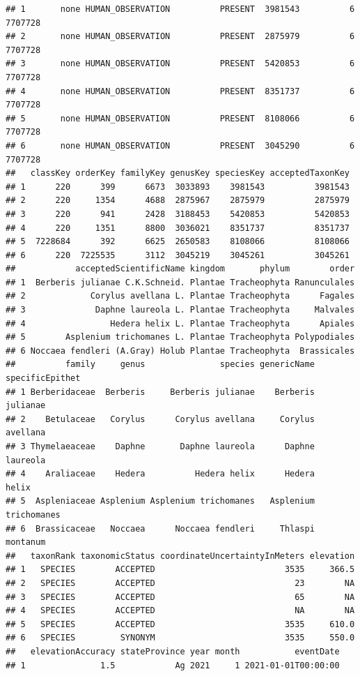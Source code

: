 \documentclass[
]{book}
\begin{document}
\begin{verbatim}
## 1       none HUMAN_OBSERVATION          PRESENT  3981543          6   7707728
## 2       none HUMAN_OBSERVATION          PRESENT  2875979          6   7707728
## 3       none HUMAN_OBSERVATION          PRESENT  5420853          6   7707728
## 4       none HUMAN_OBSERVATION          PRESENT  8351737          6   7707728
## 5       none HUMAN_OBSERVATION          PRESENT  8108066          6   7707728
## 6       none HUMAN_OBSERVATION          PRESENT  3045290          6   7707728
##   classKey orderKey familyKey genusKey speciesKey acceptedTaxonKey
## 1      220      399      6673  3033893    3981543          3981543
## 2      220     1354      4688  2875967    2875979          2875979
## 3      220      941      2428  3188453    5420853          5420853
## 4      220     1351      8800  3036021    8351737          8351737
## 5  7228684      392      6625  2650583    8108066          8108066
## 6      220  7225535      3112  3045219    3045261          3045261
##            acceptedScientificName kingdom       phylum        order
## 1  Berberis julianae C.K.Schneid. Plantae Tracheophyta Ranunculales
## 2             Corylus avellana L. Plantae Tracheophyta      Fagales
## 3              Daphne laureola L. Plantae Tracheophyta     Malvales
## 4                 Hedera helix L. Plantae Tracheophyta      Apiales
## 5        Asplenium trichomanes L. Plantae Tracheophyta Polypodiales
## 6 Noccaea fendleri (A.Gray) Holub Plantae Tracheophyta  Brassicales
##          family     genus               species genericName specificEpithet
## 1 Berberidaceae  Berberis     Berberis julianae    Berberis        julianae
## 2    Betulaceae   Corylus      Corylus avellana     Corylus        avellana
## 3 Thymelaeaceae    Daphne       Daphne laureola      Daphne        laureola
## 4    Araliaceae    Hedera          Hedera helix      Hedera           helix
## 5  Aspleniaceae Asplenium Asplenium trichomanes   Asplenium     trichomanes
## 6  Brassicaceae   Noccaea      Noccaea fendleri     Thlaspi        montanum
##   taxonRank taxonomicStatus coordinateUncertaintyInMeters elevation
## 1   SPECIES        ACCEPTED                          3535     366.5
## 2   SPECIES        ACCEPTED                            23        NA
## 3   SPECIES        ACCEPTED                            65        NA
## 4   SPECIES        ACCEPTED                            NA        NA
## 5   SPECIES        ACCEPTED                          3535     610.0
## 6   SPECIES         SYNONYM                          3535     550.0
##   elevationAccuracy stateProvince year month           eventDate
## 1               1.5            Ag 2021     1 2021-01-01T00:00:00

\end{verbatim}
\end{document}
